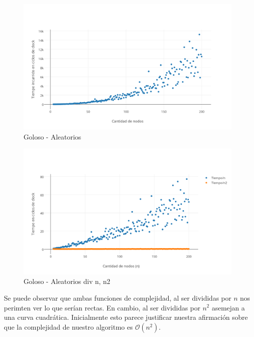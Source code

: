 \begin{figure}[htb]
	\begin{center}
    		\includegraphics[scale=0.6]{imagenes/goloso-aleatorio.png}
	\end{center}
	\caption{Goloso - Aleatorios\label{fig:2E}}
\end{figure}

\begin{figure}[htb]
	\begin{center}
    		\includegraphics[scale=0.6]{imagenes/goloso-aleatorio-div.png}
	\end{center}
	\caption{Goloso - Aleatorios div n, n2\label{fig:2F}}
\end{figure}
\FloatBarrier
Se puede observar que ambas funciones de complejidad, al ser divididas por $n$ nos perimten ver lo que serían rectas. En cambio, al ser divididas por $n^2$ asemejan a una curva cuadrática. Inicialmente esto parece justificar nuestra afirmación sobre que la complejidad de nuestro algoritmo es $\mathcal{O}(n^2)$.

